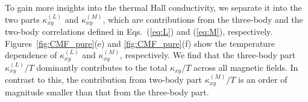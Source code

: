 \documentclass[twocolumn,superscriptaddress,showpacs, longbibliography, aps, prb]{revtex4-2}
\newcommand{\red}[1]{\textcolor{red}{#1}}
\newcommand{\blue}[1]{\textcolor{blue}{#1}}
\newcommand{\orange}[1]{\textcolor{orange}{#1}}
\begin{document}
To gain more insights %
into the thermal Hall conductivity, 
we separate it into the two parts $\kappa_{xy}^{(L)}$ and  $\kappa_{xy}^{(M)}$, which are
contributions from the three-body and the two-body correlations %
defined in Eqs.~(\ref{eq:L}) and (\ref{eq:M}), respectively.
Figures~\ref{fig:CMF_pure}(e) and \ref{fig:CMF_pure}(f) %
show the temperature dependence of $\kappa_{xy}^{(L)}$ and  $\kappa_{xy}^{(M)}$, respectively.
We find that the three-body part $\kappa_{xy}^{(L)}/T$  dominantly
contributes
to the total $\kappa_{xy}/T$ %
across all magnetic fields.
In contrast to this, the %
contribution from two-body part $\kappa_{xy}^{(M)}/T$
is an order of magnitude smaller than %
that from the three-body part.
\end{document}
